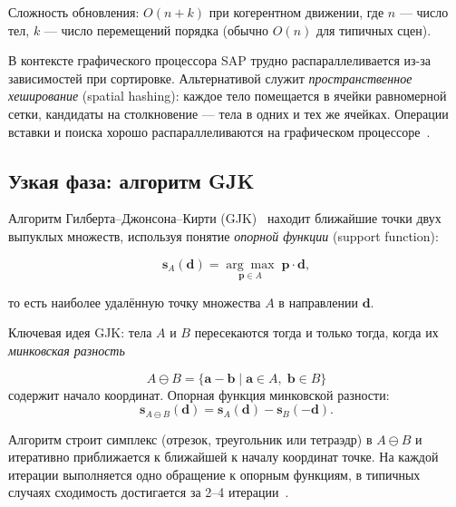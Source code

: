Сложность обновления: $O(n + k)$ при когерентном движении, где $n$ — число тел, $k$ --- число перемещений 
порядка (обычно $O(n)$ для типичных сцен).

В контексте графического процессора SAP трудно распараллеливается из-за зависимостей при сортировке. 
Альтернативой служит \emph{пространственное хеширование} (spatial hashing): каждое тело помещается в ячейки 
равномерной сетки, кандидаты на столкновение --- тела в одних и тех же ячейках. Операции вставки и поиска 
хорошо распараллеливаются на графическом процессоре~\cite{harada2007physics}.

\subsection{Узкая фаза: алгоритм GJK}

Алгоритм Гилберта–Джонсона–Кирти (GJK)~\cite{gilbert1988fast} находит ближайшие точки двух выпуклых множеств, 
используя понятие \emph{опорной функции} (support function):

\begin{equation}
  \mathbf{s}_A(\mathbf{d}) = \underset{\mathbf{p} \in A}{\arg\max}\; \mathbf{p} \cdot \mathbf{d},
\end{equation}

то есть наиболее удалённую точку множества $A$ в направлении $\mathbf{d}$.

Ключевая идея GJK: тела $A$ и $B$ пересекаются тогда и только тогда, когда их \emph{минковская разность}

\begin{equation}
  A \ominus B = \{ \mathbf{a} - \mathbf{b} \mid \mathbf{a} \in A,\; \mathbf{b} \in B \}
\end{equation}
содержит начало координат.
Опорная функция минковской разности:
\begin{equation}
  \mathbf{s}_{A \ominus B}(\mathbf{d}) = \mathbf{s}_A(\mathbf{d}) - \mathbf{s}_B(-\mathbf{d}).
\end{equation}

Алгоритм строит симплекс (отрезок, треугольник или тетраэдр) в $A \ominus B$ и итеративно приближается к 
ближайшей к началу координат точке. На каждой итерации выполняется одно обращение к опорным функциям, в 
типичных случаях сходимость достигается за 2–4 итерации~\cite{bergen2004game}.

